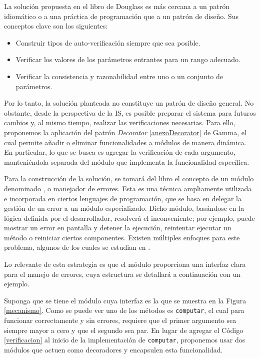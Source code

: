 La solución propuesta en el libro de Douglass \cite{douglass} es más cercana a un patrón idiomático o a una práctica de programación que a un patrón de diseño. Sus conceptos clave son los siguientes:

\begin{itemize}
    \item Construir tipos de auto-verificación siempre que sea posible.
    \item Verificar los valores de los parámetros entrantes para un rango adecuado.
    \item Verificar la consistencia y razonabilidad entre uno o un conjunto de parámetros.
\end{itemize}

Por lo tanto, la solución planteada no constituye un patrón de diseño general. No obstante, desde la perspectiva de la \gls{IS}, es posible preparar el sistema para futuros cambios y, al mismo tiempo, realizar las verificaciones necesarias. Para ello, proponemos la aplicación del patrón \textit{Decorator} \ref{anexoDecorator} de Gamma, el cual permite añadir o eliminar funcionalidades a módulos de manera dinámica. En particular, lo que se busca es agregar la verificación de cada argumento, manteniéndola separada del módulo que implementa la funcionalidad específica.


Para la construcción de la solución, se tomará del libro \cite{douglass} el concepto de un módulo denominado \ErrorHandler, o manejador de errores. Esta es una técnica ampliamente utilizada e incorporada en ciertos lenguajes de programación, que se basa en delegar la gestión de un error a un módulo especializado. Dicho módulo, basándose en la lógica definida por el desarrollador, resolverá el inconveniente; por ejemplo, puede mostrar un error en pantalla y detener la ejecución, reintentar ejecutar un método o reiniciar ciertos componentes. Existen múltiples enfoques para este problema, algunos de los cuales se estudian en \cite{glass2009graceful}.

Lo relevante de esta estrategia es que el módulo proporciona una interfaz clara para el manejo de errores, cuya estructura se detallará a continuación con un ejemplo.



Suponga que se tiene el módulo \Mecanismo cuya interfaz es la que se muestra en la Figura \ref{mecanismo}. Como se puede ver uno de los métodos es \verb|computar|, el cual para funcionar correctamente y sin errores, requiere que el primer argumento sea siempre mayor a cero y que el segundo sea par. En lugar de agregar el Código \ref{verificacion} al inicio de la implementación de \verb|computar|, proponemos usar dos módulos que actuen como decoradores y encapsulen esta funcionalidad.


